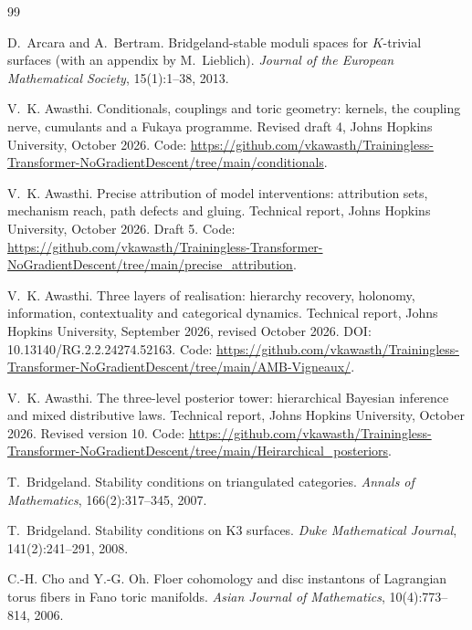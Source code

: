 \documentclass[11pt]{article}
\theoremstyle{definition}
\theoremstyle{remark}
\begin{document}
\begin{thebibliography}{99}

D.~Arcara and A.~Bertram.
\newblock Bridgeland-stable moduli spaces for {$K$}-trivial surfaces (with an appendix by M.~Lieblich).
\newblock \emph{Journal of the European Mathematical Society}, 15(1):1--38, 2013.

V.~K. Awasthi.
\newblock Conditionals, couplings and toric geometry: kernels, the coupling nerve, cumulants and a {F}ukaya
programme.
\newblock Revised draft 4, Johns Hopkins University, October 2026. Code: \url{https://github.com/vkawasth/Trainingless-Transformer-NoGradientDescent/tree/main/conditionals}.

V.~K. Awasthi.
\newblock Precise attribution of model interventions: attribution sets, mechanism reach, path defects
and gluing.
\newblock Technical report, Johns Hopkins University, October 2026. Draft 5. Code: \url{https://github.com/vkawasth/Trainingless-Transformer-NoGradientDescent/tree/main/precise_attribution}.

V.~K. Awasthi.
\newblock Three layers of realisation: hierarchy recovery, holonomy, information, contextuality and categorical dynamics.
\newblock Technical report, Johns Hopkins University, September 2026, revised October 2026.
\newblock DOI: 10.13140/RG.2.2.24274.52163. Code: \url{https://github.com/vkawasth/Trainingless-Transformer-NoGradientDescent/tree/main/AMB-Vigneaux/}.

V.~K. Awasthi.
\newblock The three-level posterior tower: hierarchical {B}ayesian inference and mixed distributive laws.
\newblock Technical report, Johns Hopkins University, October 2026. Revised version 10. Code: \url{https://github.com/vkawasth/Trainingless-Transformer-NoGradientDescent/tree/main/Heirarchical_posteriors}.

T.~Bridgeland.
\newblock Stability conditions on triangulated categories.
\newblock \emph{Annals of Mathematics}, 166(2):317--345, 2007.

T.~Bridgeland.
\newblock Stability conditions on {K}3 surfaces.
\newblock \emph{Duke Mathematical Journal}, 141(2):241--291, 2008.

C.-H. Cho and Y.-G. Oh.
\newblock Floer cohomology and disc instantons of {L}agrangian torus fibers in {F}ano toric manifolds.
\newblock \emph{Asian Journal of Mathematics}, 10(4):773--814, 2006.


\end{thebibliography}
\end{document}
